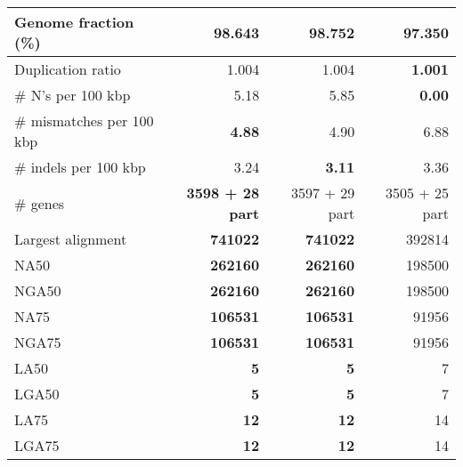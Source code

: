 \documentclass[12pt,a4paper]{article}
\begin{document}
\begin{table}[ht]
\begin{center}
\begin{tabular}{|l*{3}{|r}|}
Genome fraction (\%) & 98.643 & {\bf 98.752} & 97.350 \\ \hline
Duplication ratio & 1.004 & 1.004 & {\bf 1.001} \\ \hline
\# N's per 100 kbp & 5.18 & 5.85 & {\bf 0.00} \\ \hline
\# mismatches per 100 kbp & {\bf 4.88} & 4.90 & 6.88 \\ \hline
\# indels per 100 kbp & 3.24 & {\bf 3.11} & 3.36 \\ \hline
\# genes & {\bf 3598 + 28 part} & 3597 + 29 part & 3505 + 25 part \\ \hline
Largest alignment & {\bf 741022} & {\bf 741022} & 392814 \\ \hline
NA50 & {\bf 262160} & {\bf 262160} & 198500 \\ \hline
NGA50 & {\bf 262160} & {\bf 262160} & 198500 \\ \hline
NA75 & {\bf 106531} & {\bf 106531} & 91956 \\ \hline
NGA75 & {\bf 106531} & {\bf 106531} & 91956 \\ \hline
LA50 & {\bf 5} & {\bf 5} & 7 \\ \hline
LGA50 & {\bf 5} & {\bf 5} & 7 \\ \hline
LA75 & {\bf 12} & {\bf 12} & 14 \\ \hline
LGA75 & {\bf 12} & {\bf 12} & 14 \\ \hline
\end{tabular}
\end{center}
\end{table}
\end{document}
